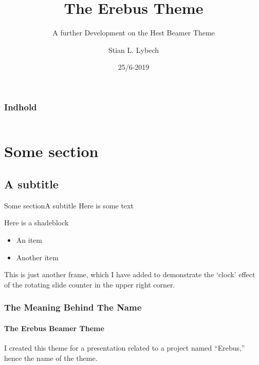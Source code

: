 \documentclass[12pt,aspectratio=169]{beamer}
\title[The Erebus Theme]{The Erebus Theme}
\subtitle[]{A further Development on the Hest Beamer Theme}
\author[Me!]{Stian L. Lybech}
\institute[AAU]{Aalborg Universitet}
\date{25/6-2019}
\begin{document}
\begin{frame} 
  \maketitle
\end{frame}


\begin{frame}
\frametitle{Indhold}
\begin{columns}[t]
  \begin{column}{.4\textwidth}
    \tableofcontents[sections={1-2}]
  \end{column}
  \begin{column}{.6\textwidth}
    \tableofcontents[sections={3-4}]
  \end{column}
\end{columns}
\end{frame}

\section{Some section}
\subsection{A subtitle}
\begin{frame}{Some section}{A subtitle}
Here is some text
  \begin{shadeblock}{Here is a shadeblock}
    \begin{itemize}
      \item An item
      \item Another item
    \end{itemize}
  \end{shadeblock}
\end{frame}

\begin{frame}
This is just another frame, which I have added to demonstrate the `clock' effect of the rotating slide counter in the upper right corner.
\end{frame}

\begin{frame}
\frametitle{The Meaning Behind The Name}
\framesubtitle{The Erebus Beamer Theme}
I created this theme for a presentation related to a project named ``Erebus,'' hence the name of the theme.
\end{frame}

\end{document}
